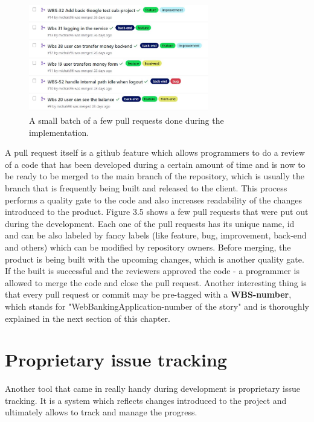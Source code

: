 \documentclass[a4paper,12pt]{book}
\newcommand\tab[1][1cm]{\hspace*{#1}}
\begin{document}
{\begin{figure}[h]
  \centering
    \includegraphics[width=0.7\textwidth]{pullrequests}
    \caption{A small batch of a few pull requests done during the implementation.~\cite{repo}}
\end{figure} 
    
A pull request itself is a github feature which allows programmers to do a review of a code that has been developed during a certain amount of time and is now to be ready to be merged to the main branch of the repository, which is usually the branch that is frequently being built and released to the client. This process performs a quality gate to the code and also increases readability of the changes introduced to the product. Figure 3.5 shows a few pull requests that were put out during the development. Each one of the pull requests has its unique name, id and can be also labeled by fancy labels (like feature, bug, improvement, back-end and others) which can be modified by repository owners. Before merging, the product is being built with the upcoming changes, which is another quality gate. If the built is successful and the reviewers approved the code - a programmer is allowed to merge the code and close the pull request. Another interesting thing is that every pull request or commit may be pre-tagged with a \textbf{WBS-number}, which stands for "WebBankingApplication-number of the story" and is thoroughly explained in the next section of this chapter. 
}
\section{Proprietary issue tracking}
{
\tab Another tool that came in really handy during development is proprietary issue tracking. It is a system which reflects changes introduced to the project and ultimately allows to track and manage the progress. 
}
\end{document}
